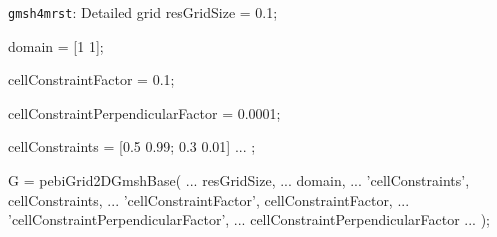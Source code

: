 \begin{matlab}[label=matlab:details]{\texttt{gmsh4mrst}: Detailed grid}
resGridSize = 0.1;

domain = [1 1];

cellConstraintFactor = 0.1;

cellConstraintPerpendicularFactor = 0.0001;  %

cellConstraints = {
    [0.5 0.99; 0.3 0.01] ...
};

G = pebiGrid2DGmshBase( ...
    resGridSize, ...
    domain, ...
    'cellConstraints', cellConstraints, ...
    'cellConstraintFactor', cellConstraintFactor, ...
    'cellConstraintPerpendicularFactor', ...
    cellConstraintPerpendicularFactor ...
);
\end{matlab}